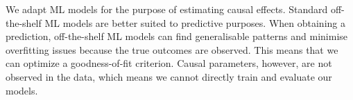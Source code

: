 \documentclass[12pt, a4paper]{article}
\begin{document}
%
%
%

We adapt ML models for the purpose of estimating causal effects. Standard off-the-shelf ML models are better suited to predictive purposes. When obtaining a prediction, off-the-shelf ML models can find generalisable patterns and minimise overfitting issues because the true outcomes are observed. This means that we can optimize a goodness-of-fit criterion. Causal parameters, however, are not observed in the data, which means we cannot directly train and evaluate our models. 
\end{document}
